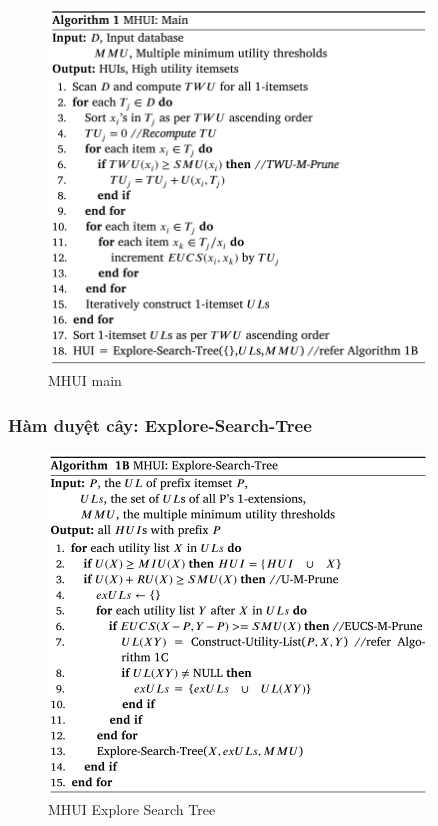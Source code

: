 \begin{figure}[h]
\centering
\includegraphics[width=0.9\textwidth]{image/algo/algo1.PNG}
\caption{\label{fig:algo1} MHUI main}
\end{figure}

\subsubsection{Hàm duyệt cây: Explore-Search-Tree }

\begin{figure}[h]
\centering
\includegraphics[width=0.9\textwidth]{image/algo/algo2.PNG}
\caption{\label{fig:algo2} MHUI Explore Search Tree}
\end{figure}

